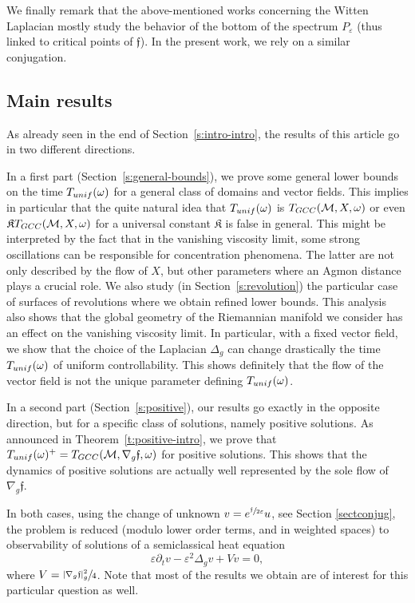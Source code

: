 \documentclass[11pt]{article}
\numberwithin{equation}{section}
\newcommand{\GCC}{\textup{GCC}}
\newcommand{\unif}{\textup{unif}}
\theoremstyle{definition}
\newcommand{\M}{\ensuremath{\mathcal M}}
\newcommand{\f}{\ensuremath{\mathfrak{f}}}
\newcommand\Lap{\Delta_{g}}
\newcommand\nablag{\nabla_{g}}
\let\e\varepsilon
\let\eps\varepsilon
\begin{document}
We finally remark that the above-mentioned works concerning the Witten Laplacian mostly study the behavior of the bottom of the spectrum $P_\eps$ (thus linked to critical points of $\f$).
In the present work, we rely on a similar conjugation.

\subsection{Main results}
\label{s:main-res}
As already seen in the end of Section~\ref{s:intro-intro}, the results of this article go in two different directions.

In a first part (Section~\ref{s:general-bounds}), we prove some general lower bounds on the time $T_{\unif}(\omega)$ for a general class of domains and vector fields. This implies in particular that the quite natural idea that $T_{\unif}(\omega)$ is $T_{\GCC}(\M,X,\omega)$ or even $\mathfrak{K}T_{\GCC}(\M,X,\omega)$ for a universal constant $\mathfrak{K}$ is false in general. This might be interpreted by the fact that in the vanishing viscosity limit, some strong oscillations can be responsible for concentration phenomena. The latter are not only described by the flow of $X$, but other parameters where an Agmon distance plays a crucial role. We also study (in Section~\ref{s:revolution}) the particular case of surfaces of revolutions where we obtain refined lower bounds. This analysis also shows that the global geometry of the Riemannian manifold we consider has an effect on the vanishing viscosity limit. In particular, with a fixed vector field, we show that the choice of the Laplacian $\Lap$ can change drastically the time $T_{\unif}(\omega)$ of uniform controllability. This shows definitely that the flow of the vector field is not the unique parameter defining $T_{\unif}(\omega)$.

In a second part (Section~\ref{s:positive}), our results go exactly in the opposite direction, but for a specific class of solutions, namely positive solutions. As announced in Theorem~\ref{t:positive-intro}, we prove that $T_{\unif}(\omega)^+=T_{\GCC}(\M,\nabla_g\f,\omega)$ for positive solutions.
This shows that the dynamics of positive solutions are actually well represented by the sole flow of~$\nabla_g\f$.

In both cases, using the change of unknown $v= e^{\sfrac{\f}{2\eps}} u$, see Section \ref{sectconjug}, the problem is reduced (modulo lower order terms, and in weighted spaces) to observability of solutions of a semiclassical heat equation
\[
\e\partial_t v- \eps^2 \Lap v+Vv =0,
\]
where $V= \sfrac{|\nablag \f|_g^2}{4}$. Note that most of the results we obtain are of interest for this particular question as well.
\end{document}
